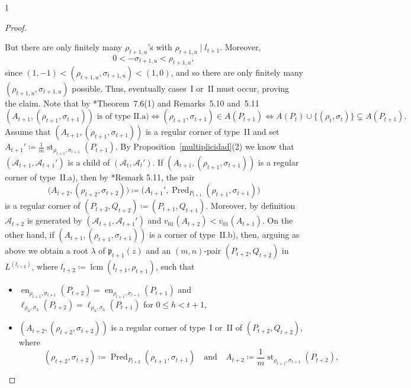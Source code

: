 \documentclass[reqno,a4paper,twoside]{amsart}
\theoremstyle{definition}
\theoremstyle{remark}
\DeclareMathOperator{\en}{en}
\DeclareMathOperator{\st}{st}
\DeclareMathOperator{\Pred}{Pred}
\DeclareMathOperator{\lcm}{lcm}
\begin{document}
\begin{spacing}{1}
\begin{proof}
\begin{itemize}[itemsep=0.5675ex,topsep=0.5675ex]
\end{itemize}
But there are only finitely many $\rho_{t+1,u}$'s with $\rho_{t+1,u}\mid l_{t+1}$. Moreover,
$$
0<-\sigma_{t+1,u}<\rho_{t+1,u},
$$
since $(1,-1)<(\rho_{t+1,u},\sigma_{t+1,u})<(1,0)$, and so there are only finitely many $(\rho_{t+1,u},\sigma_{t+1,u})$ possible. Thus, eventually cases~I or~II must occur, proving the claim. Note that by \cite{GGV1}*{Theorem~7.6(1) and Remarks~5.10 and~5.11}
$$
(A_{t+1},(\rho_{t+1},\sigma_{t+1}))\text{ is of type~II.a)} \Leftrightarrow (\rho_{t+1},\sigma_{t+1})\in A(P_{t+1}) \Leftrightarrow A(P_t)\cup \{(\rho_t,\sigma_t)\}\subsetneq A(P_{t+1}).
$$
Assume that $(A_{t+1},(\rho_{t+1},\sigma_{t+1}))$ is a regular corner of type~II and set $A_{t+1}'\coloneqq \frac{1}{m}\st_{\rho_{t+1},\sigma_{t+1}}(P_{t+1})$. By Pro\-position~\ref{multiplicidad}(2) we know that $(\mathcal{A}_{t+1},\mathcal{A}_{t+1}')$ is a child of $(\mathcal{A}_t,\mathcal{A}_t')$. If $(A_{t+1},(\rho_{t+1},\sigma_{t+1}))$ is a regular corner of type~II.a), then by \cite{GGV1}*{Remark 5.11}, the pair
\begin{equation*}
\bigl(A_{t+2},(\rho_{t+2},\sigma_{t+2})\bigr)\coloneqq \bigl(A_{t+1}',\Pred_{P_{t+1}}(\rho_{t+1},\sigma_{t+1})\bigr)
\end{equation*}
is a regular corner of $(P_{t+2},Q_{t+2})\coloneqq (P_{t+1},Q_{t+1})$. Moreover, by definition $\mathcal{A}_{t+2}$ is generated by $(\mathcal{A}_{t+1},\mathcal{A}_{t+1}')$ and $v_{01}(A_{t+2})<v_{01}(A_{t+1})$. On the other hand, if $(A_{t+1},(\rho_{t+1},\sigma_{t+1}))$ is a cor\-ner of type~II.b), then, arguing as above we obtain a root $\lambda$ of $\mathfrak{p}_{t+1}(z)$ and an $(m,n)$-pair $(P_{t+2},Q_{t+2})$ in $L^{(l_{t+2})}$, where $l_{t+2}\coloneqq \lcm(l_{t+1},\rho_{t+1})$, such that

\begin{itemize}[itemsep=0.5675ex,topsep=0.5675ex]

\item[-] $\en_{\rho_{t+1},\sigma_{t+1}}(P_{t+2}) = \en_{\rho_{t+1},\sigma_{t+1}}(P_{t+1})$ and  $\ell_{\rho_h,\sigma_h}(P_{t+2}) = \ell_{\rho_h,\sigma_h}(P_{t+1})$ for $0\le h < t+1$,

\item[-] $(A_{t+2},(\rho_{t+2},\sigma_{t+2}))$ is a regular corner of type~I or~II of $(P_{t+2},Q_{t+2})$, where
$$
\qquad\quad (\rho_{t+2},\sigma_{t+2})\coloneqq \Pred_{P_{t+2}}(\rho_{t+1},\sigma_{t+1})\quad\text{and}\quad  A_{t+2}\coloneqq \frac{1}{m} \st_{\rho_{t+1},\sigma_{t+1}}(P_{t+2}),
$$


\end{itemize}
\end{proof}
\end{spacing}
\end{document}
